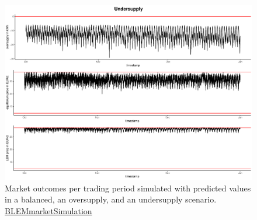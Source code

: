 \begin{figure}[H]
    \centering
    \includegraphics[width=\textwidth-.85cm]{thesis/graphs/marketsimulation/marketoutcome_pred_undersupply.pdf}
    \caption[Market outcomes simulated in three supply scenarios with predicted values]{Market outcomes per trading period simulated with predicted values in a balanced, an oversupply, and an undersupply scenario. \quantnet\href{https://github.com/QuantLet/BLEM/tree/master/BLEMmarketSimulation}{BLEMmarketSimulation}}
\end{figure}

